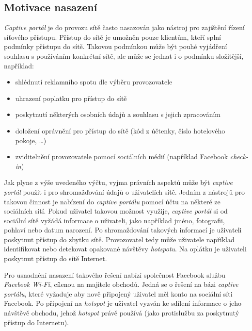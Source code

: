 \documentclass[thesis=M,czech]{FITthesis}[2012/10/20]
\begin{document}
\subsection{Motivace nasazení}


\textit{Captive portál} je do provozu sítě často nasazován jako nástroj pro zajištění řízení síťového přístupu. Přístup do sítě je umožněn pouze klientům, kteří splní podmínky přístupu do sítě. Takovou podmínkou může být pouhé vyjádření souhlasu s používáním konkrétní sítě, ale může se jednat i o podmínku složitější, například:

\begin{itemize}
 \item shlédnutí reklamního spotu dle výběru provozovatele
 \item uhrazení poplatku pro přístup do sítě
 \item poskytnutí některých osobních údajů a souhlasu s jejich zpracováním
 \item doložení oprávnění pro přístup do sítě (kód z účtenky, číslo hotelového pokoje, \ldots)
 \item zviditelnění provozovatele pomocí sociálních médií (například Facebook \textit{check-in})
\end{itemize}

Jak plyne z výše uvedeného výčtu, vyjma právních aspektů může být \textit{captive portál} použit i pro shromažďování údajů o uživatelích sítě. Jedním z nástrojů pro takovou činnost je nabízení  do \textit{captive portálu} pomocí účtu na některé ze sociálních sítí. Pokud uživatel takovou možnost využije, \textit{captive portál} si od sociální sítě vyžádá informace o uživateli, jako například jméno, fotografii, pohlaví nebo datum narození. Po shromažďování takových informací je uživateli poskytnut přístup do zbytku sítě. Provozovatel tedy může uživatele například identifikovat nebo detekovat opakované návštěvy \textit{hotspotu}. Na oplátku je uživateli  poskytnut přístup do sítě Internet.


Pro usnadnění nasazení takového řešení nabízí společnost Facebook službu \textit{Facebook Wi-Fi}\cite{facebook-wifi}, cílenou na majitele obchodů. Jedná se o řešení na bázi \textit{captive portálu}, které vyžaduje aby nově připojený uživatel měl konto na sociální síti Facebook. Po připojení na \textit{hotspot} je uživatel vyzván ke sdílení informace o jeho návštěvě obchodu, jehož \textit{hotspot} právě používá (jako protislužbu za poskytnutý přístup do Internetu).
\end{document}
